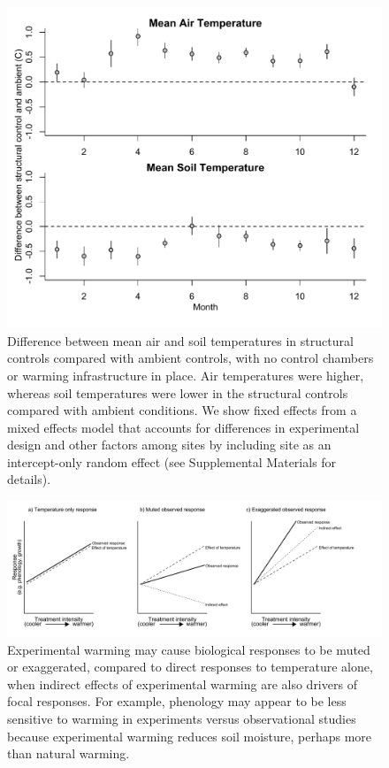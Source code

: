 \documentclass{article}
\begin{document}
 \begin{figure}[h]
     \centering
 \includegraphics{../figures/ShamVSAmbient_mean.pdf}    
 \caption{Difference between mean air and soil temperatures in structural controls compared with ambient controls, with no control chambers or warming infrastructure in place. Air temperatures were higher, whereas soil temperatures were lower in the structural controls compared with ambient conditions. We show fixed effects from a mixed effects model that accounts for differences in experimental design and other factors among sites by including site as an intercept-only random effect (see Supplemental Materials for details). } %
 \end{figure}
 \clearpage
 \begin{figure}[h]
     \centering
 \includegraphics{../figures/DirIndWarmingEffects.pdf}    
 \caption{Experimental warming may cause biological responses to be muted or exaggerated, compared to direct responses to temperature alone, when indirect effects of experimental warming are also drivers of focal responses. For example, phenology may appear to be less sensitive to warming in experiments versus observational studies \citep{wolkovich2012} because experimental warming reduces soil moisture, perhaps more than natural warming.} 
 \end{figure}
\clearpage
\end{document}
